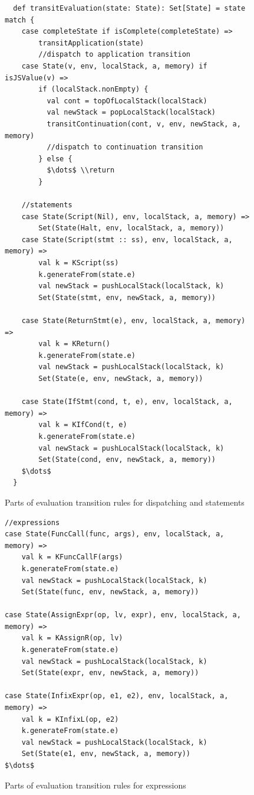 \documentclass[12pt]{report}
\begin{document}
\begin{figure}
\lstset{language=Scala, mathescape}
\begin{lstlisting}
  def transitEvaluation(state: State): Set[State] = state match {
    case completeState if isComplete(completeState) =>
        transitApplication(state)
        //dispatch to application transition
    case State(v, env, localStack, a, memory) if isJSValue(v) =>
        if (localStack.nonEmpty) {
          val cont = topOfLocalStack(localStack)
          val newStack = popLocalStack(localStack)
          transitContinuation(cont, v, env, newStack, a, memory)
          //dispatch to continuation transition
        } else {
          $\dots$ \\return
        }

    //statements
    case State(Script(Nil), env, localStack, a, memory) =>
        Set(State(Halt, env, localStack, a, memory))
    case State(Script(stmt :: ss), env, localStack, a, memory) =>
        val k = KScript(ss)
        k.generateFrom(state.e)
        val newStack = pushLocalStack(localStack, k)
        Set(State(stmt, env, newStack, a, memory))

    case State(ReturnStmt(e), env, localStack, a, memory) =>
        val k = KReturn()
        k.generateFrom(state.e)
        val newStack = pushLocalStack(localStack, k)
        Set(State(e, env, newStack, a, memory))

    case State(IfStmt(cond, t, e), env, localStack, a, memory) =>
        val k = KIfCond(t, e)
        k.generateFrom(state.e)
        val newStack = pushLocalStack(localStack, k)
        Set(State(cond, env, newStack, a, memory))
    $\dots$
  }
\end{lstlisting}
\caption{Parts of evaluation transition rules for dispatching and statements}
\label{fig:eval}
\end{figure}


\begin{figure}
\lstset{language=Scala, mathescape}
\begin{lstlisting}
//expressions
case State(FuncCall(func, args), env, localStack, a, memory) =>
    val k = KFuncCallF(args)
    k.generateFrom(state.e)
    val newStack = pushLocalStack(localStack, k)
    Set(State(func, env, newStack, a, memory))

case State(AssignExpr(op, lv, expr), env, localStack, a, memory) =>
    val k = KAssignR(op, lv)
    k.generateFrom(state.e)
    val newStack = pushLocalStack(localStack, k)
    Set(State(expr, env, newStack, a, memory))

case State(InfixExpr(op, e1, e2), env, localStack, a, memory) =>
    val k = KInfixL(op, e2)
    k.generateFrom(state.e)
    val newStack = pushLocalStack(localStack, k)
    Set(State(e1, env, newStack, a, memory))
$\dots$
\end{lstlisting}
\label{fig:eval}
\caption{Parts of evaluation transition rules for expressions}
\end{figure}
\end{document}
